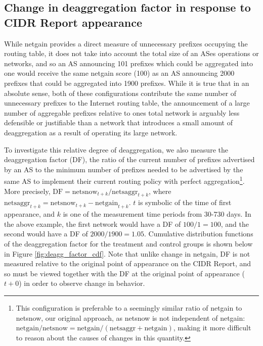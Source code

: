 \subsection{Change in deaggregation factor in response to CIDR Report
appearance}

While netgain provides a direct measure of unnecessary prefixes occupying the
routing table, it does not take into account the total size of an ASes
operations or networks, and so an AS announcing 101 prefixes which could be
aggregated into one would receive the same netgain score (100) as an AS
announcing 2000 prefixes that could be aggregated into 1900 prefixes. While it
is true that in an absolute sense, both of these configurations contribute the
same number of unnecessary prefixes to the Internet routing table, the
announcement of a large number of aggregable prefixes relative to ones total
network is arguably less defensible or justifiable than a network that
introduces a small amount of deaggregation as a result of operating its large
network.

To investigate this relative degree of deaggregation, we also measure the
deaggregation factor (DF), the ratio of the current number of prefixes
advertised by an AS to the minimum number of prefixes needed to be advertised
by the same AS to implement their current routing policy with perfect
aggregation\footnote{This configuration is preferable to a seemingly similar
ratio of netgain to netsnow, our original approach, as netsnow is not
independent of netgain:
$\textrm{netgain}/\textrm{netsnow} =
\textrm{netgain}/(\textrm{netsaggr}+\textrm{netgain})$, making it more
difficult to reason about the causes of changes in this quantity.}.
More precisely,
$\textrm{DF}=\textrm{netsnow}_{t+k}/\textrm{netsaggr}_{t+k}$, where
$\textrm{netsaggr}_{t+k}=\textrm{netsnow}_{t+k}-\textrm{netgain}_{t+k}$. $t$ is
symbolic of the time of first appearance, and $k$ is one of the measurement
time periods from 30-730 days. In the above example, the first network would
have a DF of $\textrm{100}/\textrm{1}=\textrm{100}$, and the second would have
a DF of $\textrm{2000}/\textrm{1900}=\textrm{1.05}$. Cumulative distribution
functions of the deaggregation factor for the treatment and control groups is
shown below in Figure \ref{fig:deagg_factor_cdf}. Note that unlike change in
netgain, DF is not measured relative to the original point of appearance on the
CIDR Report, and so must be viewed together with the DF at the original point
of appearance ($t+0$) in order to observe change in behavior.

